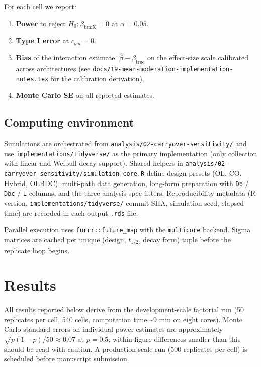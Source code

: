 \documentclass[
]{article}
\providecommand{\tightlist}{%
  \setlength{\itemsep}{0pt}\setlength{\parskip}{0pt}}
\begin{document}
For each cell we report:

\begin{enumerate}
\def\labelenumi{\arabic{enumi}.}
\tightlist
\item
  \textbf{Power} to reject \(H_0: \beta_{\text{bm:X}} = 0\) at
  \(\alpha = 0.05\).
\item
  \textbf{Type I error} at \(c_{bm} = 0\).
\item
  \textbf{Bias} of the interaction estimate: \(\hat{\beta} -
  \beta_{\text{true}}\) on the effect-size scale calibrated
  across architectures (see
  \texttt{docs/19-mean-moderation-implementation-notes.tex} for the
  calibration derivation).
\item
  \textbf{Monte Carlo SE} on all reported estimates.
\end{enumerate}

\subsection{Computing environment}\label{computing-environment}

Simulations are orchestrated from
\texttt{analysis/02-carryover-sensitivity/} and use
\texttt{implementations/tidyverse/} as the primary implementation
(only collection with linear and Weibull decay support). Shared
helpers in \texttt{analysis/02-carryover-sensitivity/simulation-core.R}
define design presets (OL, CO, Hybrid, OLBDC), multi-path data
generation, long-form preparation with \texttt{Db} / \texttt{Dbc} / \texttt{L}
columns, and the three analysis-spec fitters.
Reproducibility metadata (R version, \texttt{implementations/tidyverse/}
commit SHA, simulation seed, elapsed time) are recorded in each
output \texttt{.rds} file.

Parallel execution uses \texttt{furrr::future\_map} with the \texttt{multicore}
backend. Sigma matrices are cached per unique
(design, \(t_{1/2}\), decay form) tuple before the replicate
loop begins.

\section{Results}\label{results}

All results reported below derive from the development-scale
factorial run (50 replicates per cell, 540 cells, computation
time \textasciitilde9 min on eight cores). Monte Carlo standard errors on
individual power estimates are approximately
\(\sqrt{p(1-p)/50} \approx 0.07\) at \(p = 0.5\); within-figure
differences smaller than this should be read with caution.
A production-scale run (500 replicates per cell) is scheduled
before manuscript submission.
\end{document}
